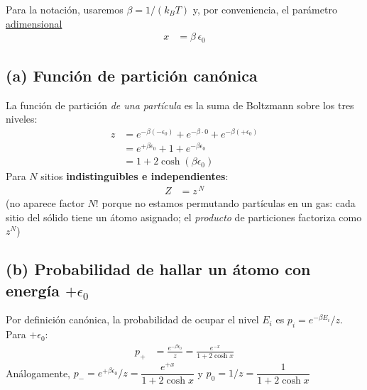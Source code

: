 \documentclass{article}
\begin{document}
Para la notación, usaremos $\beta=1/(k_B T)$ y, por conveniencia, el parámetro \underline{adimensional}
\begin{equation}
\begin{split}
x
&= \beta\,\epsilon_0
\end{split}\label{eq:def_x}
\end{equation}

\subsection*{(a) Función de partición canónica}

La función de partición \textit{de una partícula} es la suma de Boltzmann sobre los tres niveles:
\begin{equation}
\begin{split}
z
&= e^{-\beta(-\epsilon_0)} + e^{-\beta\cdot 0} + e^{-\beta(+\epsilon_0)}\\
&= e^{+\beta\epsilon_0} + 1 + e^{-\beta\epsilon_0}\\
&= 1 + 2\cosh(\beta\epsilon_0)
\end{split}\label{eq:z_una_particula}
\end{equation}
Para $N$ sitios \textbf{indistinguibles e independientes}:
\begin{equation}
\begin{split}
Z
&= z^{\,N}
\end{split}\label{eq:Z_total_tres_niveles}
\end{equation}
(no aparece factor $N!$ porque no estamos permutando partículas en un gas: cada sitio del sólido tiene un átomo asignado; el \textit{producto} de particiones factoriza como $z^N$)

\subsection*{(b) Probabilidad de hallar un átomo con energía $+\epsilon_0$}

Por definición canónica, la probabilidad de ocupar el nivel $E_i$ es $p_i=e^{-\beta E_i}/z$. Para $+\epsilon_0$:
\begin{equation}
\begin{split}
p_{+}
&= \frac{e^{-\beta\epsilon_0}}{z}
= \frac{e^{-x}}{1+2\cosh x}
\end{split}\label{eq:prob_p}
\end{equation}
Análogamente, $p_{-}=e^{+\beta\epsilon_0}/z=\dfrac{e^{+x}}{1+2\cosh x}$ y $p_{0}=1/z=\dfrac{1}{1+2\cosh x}$
\end{document}
